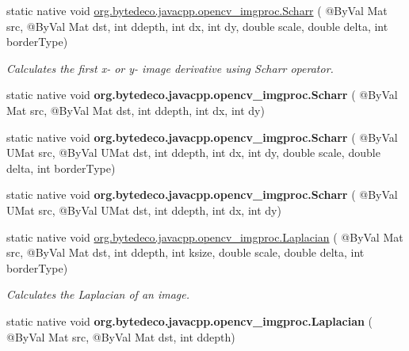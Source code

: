 \begin{DoxyCompactItemize}
\item 
static native void \hyperlink{group__imgproc__filter_gabd4c276a8055604be5e13e061eee74a1}{org.\+bytedeco.\+javacpp.\+opencv\+\_\+imgproc.\+Scharr} ( @By\+Val Mat src, @By\+Val Mat dst, int ddepth, int dx, int dy, double scale, double delta, int border\+Type)
\begin{DoxyCompactList}\small\item\em Calculates the first x-\/ or y-\/ image derivative using Scharr operator. \end{DoxyCompactList}\item 
\mbox{\label{group__imgproc__filter_gaf8b36fd326b781bdfbe1b71222cddc76}} 
static native void {\bfseries org.\+bytedeco.\+javacpp.\+opencv\+\_\+imgproc.\+Scharr} ( @By\+Val Mat src, @By\+Val Mat dst, int ddepth, int dx, int dy)
\item 
\mbox{\label{group__imgproc__filter_gae9f59b1abc18c3bce3619ff427aa27fd}} 
static native void {\bfseries org.\+bytedeco.\+javacpp.\+opencv\+\_\+imgproc.\+Scharr} ( @By\+Val U\+Mat src, @By\+Val U\+Mat dst, int ddepth, int dx, int dy, double scale, double delta, int border\+Type)
\item 
\mbox{\label{group__imgproc__filter_ga8aa42854b5ace626e6e40c3d80921e27}} 
static native void {\bfseries org.\+bytedeco.\+javacpp.\+opencv\+\_\+imgproc.\+Scharr} ( @By\+Val U\+Mat src, @By\+Val U\+Mat dst, int ddepth, int dx, int dy)
\item 
static native void \hyperlink{group__imgproc__filter_ga223106fa434e6e5dee1974eab81bbf26}{org.\+bytedeco.\+javacpp.\+opencv\+\_\+imgproc.\+Laplacian} ( @By\+Val Mat src, @By\+Val Mat dst, int ddepth, int ksize, double scale, double delta, int border\+Type)
\begin{DoxyCompactList}\small\item\em Calculates the Laplacian of an image. \end{DoxyCompactList}\item 
\mbox{\label{group__imgproc__filter_gabbed757ee3966f8466a886e2eab4abbb}} 
static native void {\bfseries org.\+bytedeco.\+javacpp.\+opencv\+\_\+imgproc.\+Laplacian} ( @By\+Val Mat src, @By\+Val Mat dst, int ddepth)
\item 
\mbox{\label{group__imgproc__filter_ga53a73c7ebe19e765d5a5c3ddd0021e93}} 

\end{DoxyCompactItemize}
